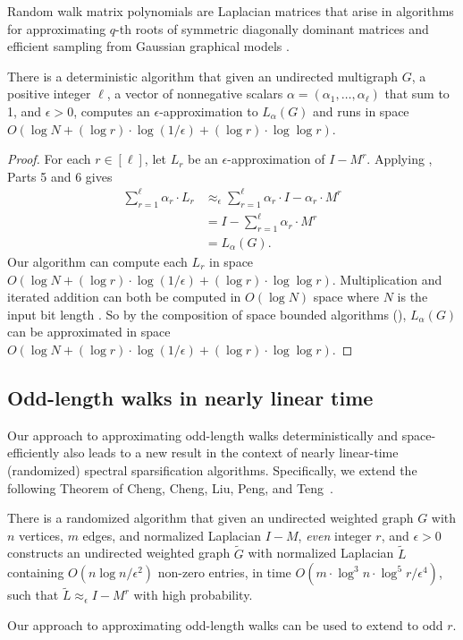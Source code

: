 \documentclass{toc}
\newcommand{\wt}{\widetilde}   %
\newcommand{\SC}{O(\log N + (\log r)\cdot\log(1/\epsilon)+(\log r)\cdot \log\log r)}
\numberwithin{myalgctr}{section}
\theoremstyle{named}
\begin{document}
Random walk matrix polynomials are Laplacian matrices that arise in algorithms for approximating $q$-th roots of symmetric diagonally dominant matrices and efficient sampling from Gaussian graphical models \cite{loh12,cheng2015,ChengCLPT14}. 
\begin{corollary}
There is a deterministic algorithm that given an undirected multigraph $G$, a positive integer $\ell$, a vector of nonnegative scalars $\alpha=(\alpha_1,\ldots,\alpha_{\ell})$ that sum to 1, and $\epsilon>0$, computes an $\epsilon$-approximation to $L_{\alpha}(G)$ and runs in space $\SC$.
\end{corollary}
\begin{proof}
For each $r\in[\ell]$, let $L_r$ be an $\epsilon$-approximation of $I-M^r$. Applying , Parts 5 and 6 gives
\begin{align*}
\sum_{r=1}^{\ell}\alpha_r\cdot L_{r} &\approx_{\epsilon}\sum_{r=1}^{\ell}\alpha_{r}\cdot I-\alpha_r\cdot M^r\\
&=I-\sum_{r=1}^{\ell}\alpha_{r}\cdot M^r\\
&=L_{\alpha}(G).
\end{align*}
Our algorithm can compute each $L_r$ in space $\SC$. Multiplication and iterated addition can both be computed in $O(\log N)$ space where $N$ is the input bit length \cite{BCH86,ABH02}. So by the composition of space bounded algorithms (), $L_{\alpha}(G)$ can be approximated in space $\SC$.
\end{proof}

%
\subsection{Odd-length walks in nearly linear time}
Our approach to approximating odd-length walks deterministically and space-efficiently also leads to a new result in the context of nearly linear-time (randomized) spectral sparsification algorithms. Specifically, we extend the following Theorem of Cheng, Cheng, Liu, Peng, and Teng~\cite{cheng2015}.

\begin{theorem}
\label{thm:lintime}
There is a randomized algorithm that given an undirected weighted graph  $G$ with $n$ vertices, $m$ edges, and normalized Laplacian $I-M$, \emph{even} integer $r$, and $\epsilon>0$ constructs an undirected weighted graph $\wt{G}$ with normalized Laplacian $\wt{L}$ containing $O(n\log n/\epsilon^2)$ non-zero entries, in time $O(m\cdot \log^3 n\cdot \log^5 r/\epsilon^4)$, such that $\wt{L}\approx_{\epsilon}I-M^r$ with high probability.
\end{theorem}
Our approach to approximating odd-length walks can be used to extend  to odd $r$. 
\end{document}
